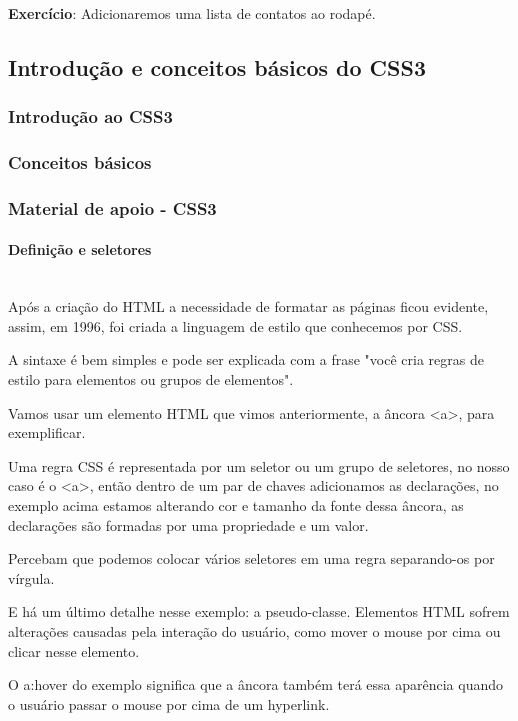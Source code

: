 \documentclass[12pt,a4paper]{article}
\begin{document}
	\textbf{Exercício}: Adicionaremos uma lista de contatos ao rodapé.
	
	\subsection{Introdução e conceitos básicos do CSS3}
	\subsubsection{Introdução ao CSS3}
	
	\subsubsection{Conceitos básicos}
	
	\subsubsection{Material de apoio - CSS3}
	
	\paragraph{Definição e seletores} \mbox{} \\
	
	Após a criação do HTML a necessidade de formatar as páginas ficou evidente, assim, em 1996, foi criada a linguagem de estilo que conhecemos por CSS.
	
	A sintaxe é bem simples e pode ser explicada com a frase "você cria regras de estilo para elementos ou grupos de elementos".
	
	Vamos usar um elemento HTML que vimos anteriormente, a âncora <a>, para exemplificar.
	
	Uma regra CSS é representada por um seletor ou um grupo de seletores, no nosso caso é o <a>, então dentro de um par de chaves adicionamos as declarações, no exemplo acima estamos alterando cor e tamanho da fonte dessa âncora, as declarações são formadas por uma propriedade e um valor.
	
	Percebam que podemos colocar vários seletores em uma regra separando-os por vírgula.
	
	E há um último detalhe nesse exemplo: a pseudo-classe. Elementos HTML sofrem alterações causadas pela interação do usuário, como mover o mouse por cima ou clicar nesse elemento.
	
	O a:hover do exemplo significa que a âncora também terá essa aparência quando o usuário passar o mouse por cima de um hyperlink.
	
\end{document}

